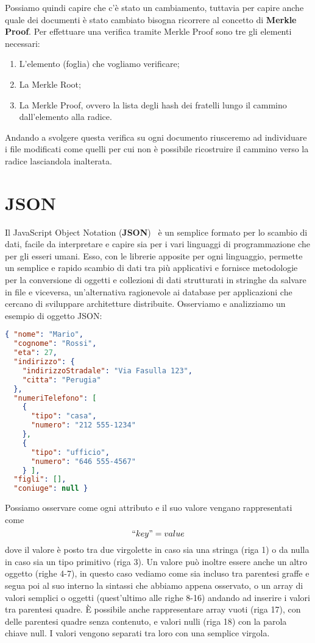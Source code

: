Possiamo quindi capire che c'è stato un cambiamento, tuttavia per capire anche
quale dei documenti è stato cambiato bisogna ricorrere al concetto di \textbf{Merkle Proof}.
Per effettuare una verifica tramite Merkle Proof sono tre gli elementi necessari:
\begin{enumerate}
    \item L'elemento (foglia) che vogliamo verificare;
    \item La Merkle Root;
    \item La Merkle Proof, ovvero la lista degli hash dei fratelli lungo il cammino dall'elemento alla radice.
\end{enumerate}
Andando a svolgere questa verifica su ogni documento riusceremo ad individuare i file modificati come
quelli per cui non è possibile ricostruire il cammino verso la radice lasciandola inalterata.

\section{JSON}
\label{sub:json}
Il JavaScript Object Notation (\textbf{JSON})~\cite{json} è un semplice formato per lo scambio di dati,
facile da interpretare e capire sia per i vari linguaggi di programmazione che per gli esseri umani.
Esso, con le librerie apposite per ogni linguaggio, permette un semplice e rapido scambio
di dati tra più applicativi e fornisce metodologie per la conversione di oggetti e collezioni
di dati strutturati in stringhe da salvare in file e viceversa, un'alternativa ragionevole ai database
per applicazioni che cercano di sviluppare architetture distribuite.
Osserviamo e analizziamo un esempio di oggetto JSON:
\begin{lstlisting}[language=json,firstnumber=1]
{ "nome": "Mario",
  "cognome": "Rossi",
  "eta": 27,
  "indirizzo": {
    "indirizzoStradale": "Via Fasulla 123",
    "citta": "Perugia"
  },
  "numeriTelefono": [
    {
      "tipo": "casa",
      "numero": "212 555-1234"
    },
    {
      "tipo": "ufficio",
      "numero": "646 555-4567"
    } ],
  "figli": [],
  "coniuge": null }
\end{lstlisting} 
Possiamo osservare come ogni attributo e il suo valore vengano rappresentati come
\[``key" = value \]
dove il valore è posto tra due virgolette in caso sia una stringa (\textsf{riga 1})
o da nulla in caso sia un tipo primitivo (\textsf{riga 3}).
Un valore può inoltre essere anche un altro oggetto (\textsf{righe 4-7}), in questo caso
vediamo come sia incluso tra parentesi graffe e segua poi al suo interno la sintassi che
abbiamo appena osservato, o un array di valori semplici o oggetti (quest'ultimo alle \textsf{righe 8-16})
andando ad inserire i valori tra parentesi quadre.
È possibile anche rappresentare array vuoti (\textsf{riga 17}), con delle parentesi quadre senza
contenuto, e valori nulli (\textsf{riga 18}) con la parola chiave \textsf{null}.
I valori vengono separati tra loro con una semplice virgola.